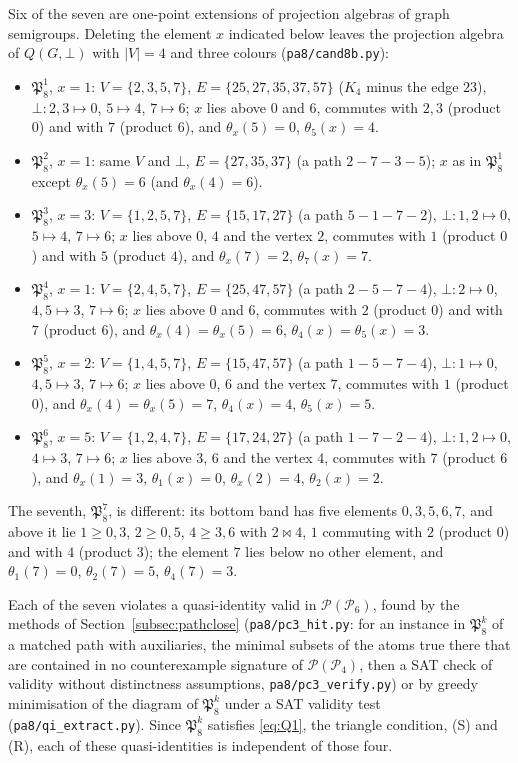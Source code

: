 \documentclass[11pt]{amsart}
\theoremstyle{definition}
\renewcommand{\P}{\mathcal{P}}
\newcommand{\mt}{\bowtie}   %
\begin{document}
Six of the seven are one-point extensions of projection algebras of graph semigroups. Deleting the element $x$ indicated below leaves the projection algebra of $Q(G,\bot)$ with $|V|=4$ and three colours (\texttt{pa8/cand8b.py}):
\begin{itemize}[nosep]
\item $\mathfrak P_8^1$, $x=1$: $V=\{2,3,5,7\}$, $E=\{25,27,35,37,57\}$ ($K_4$ minus the edge $23$), $\bot\colon2,3\mapsto0$, $5\mapsto4$, $7\mapsto6$; $x$ lies above $0$ and $6$, commutes with $2,3$ (product $0$) and with $7$ (product $6$), and $\theta_x(5)=0$, $\theta_5(x)=4$.
\item $\mathfrak P_8^2$, $x=1$: same $V$ and $\bot$, $E=\{27,35,37\}$ (a path $2-7-3-5$); $x$ as in $\mathfrak P_8^1$ except $\theta_x(5)=6$ (and $\theta_x(4)=6$).
\item $\mathfrak P_8^3$, $x=3$: $V=\{1,2,5,7\}$, $E=\{15,17,27\}$ (a path $5-1-7-2$), $\bot\colon1,2\mapsto0$, $5\mapsto4$, $7\mapsto6$; $x$ lies above $0$, $4$ and the vertex $2$, commutes with $1$ (product $0$) and with $5$ (product $4$), and $\theta_x(7)=2$, $\theta_7(x)=7$.
\item $\mathfrak P_8^4$, $x=1$: $V=\{2,4,5,7\}$, $E=\{25,47,57\}$ (a path $2-5-7-4$), $\bot\colon2\mapsto0$, $4,5\mapsto3$, $7\mapsto6$; $x$ lies above $0$ and $6$, commutes with $2$ (product $0$) and with $7$ (product $6$), and $\theta_x(4)=\theta_x(5)=6$, $\theta_4(x)=\theta_5(x)=3$.
\item $\mathfrak P_8^5$, $x=2$: $V=\{1,4,5,7\}$, $E=\{15,47,57\}$ (a path $1-5-7-4$), $\bot\colon1\mapsto0$, $4,5\mapsto3$, $7\mapsto6$; $x$ lies above $0$, $6$ and the vertex $7$, commutes with $1$ (product $0$), and $\theta_x(4)=\theta_x(5)=7$, $\theta_4(x)=4$, $\theta_5(x)=5$.
\item $\mathfrak P_8^6$, $x=5$: $V=\{1,2,4,7\}$, $E=\{17,24,27\}$ (a path $1-7-2-4$), $\bot\colon1,2\mapsto0$, $4\mapsto3$, $7\mapsto6$; $x$ lies above $3$, $6$ and the vertex $4$, commutes with $7$ (product $6$), and $\theta_x(1)=3$, $\theta_1(x)=0$, $\theta_x(2)=4$, $\theta_2(x)=2$.
\end{itemize}
The seventh, $\mathfrak P_8^7$, is different: its bottom band has five elements $0,3,5,6,7$, and above it lie $1\ge0,3$, $2\ge0,5$, $4\ge3,6$ with $2\mt4$, $1$ commuting with $2$ (product $0$) and with $4$ (product $3$); the element $7$ lies below no other element, and $\theta_1(7)=0$, $\theta_2(7)=5$, $\theta_4(7)=3$.

Each of the seven violates a quasi-identity valid in $\P(\P_6)$, found by the methods of Section~\ref{subsec:pathclose} (\texttt{pa8/pc3\_hit.py}: for an instance in $\mathfrak P_8^k$ of a matched path with auxiliaries, the minimal subsets of the atoms true there that are contained in no counterexample signature of $\P(\P_4)$, then a SAT check of validity without distinctness assumptions, \texttt{pa8/pc3\_verify.py}) or by greedy minimisation of the diagram of $\mathfrak P_8^k$ under a SAT validity test (\texttt{pa8/qi\_extract.py}). Since $\mathfrak P_8^k$ satisfies \eqref{eq:Q1}, the triangle condition, (S) and (R), each of these quasi-identities is independent of those four.
\end{document}
